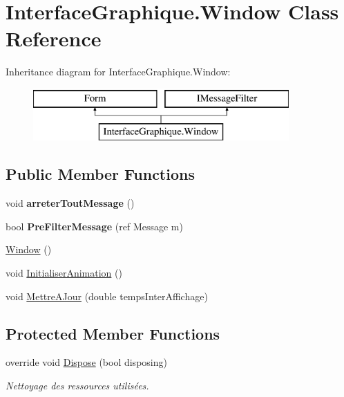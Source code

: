 \hypertarget{class_interface_graphique_1_1_window}{}\section{Interface\+Graphique.\+Window Class Reference}
\label{class_interface_graphique_1_1_window}
Inheritance diagram for Interface\+Graphique.\+Window\+:\begin{figure}[H]
\begin{center}
\leavevmode
\includegraphics[height=2.000000cm]{class_interface_graphique_1_1_window}
\end{center}
\end{figure}
\subsection*{Public Member Functions}
\begin{DoxyCompactItemize}
\item 
void {\bfseries arreter\+Tout\+Message} ()
\item 
bool {\bfseries Pre\+Filter\+Message} (ref Message m)
\item 
\hyperlink{group__inf2990_ga7e30ec49435f3c0fba10654f5d4c80f0}{Window} ()
\item 
void \hyperlink{group__inf2990_ga3a7a6e48395a43de034017fd06ab0b15}{Initialiser\+Animation} ()
\item 
void \hyperlink{group__inf2990_ga59ab317065d928c64d22120800595079}{Mettre\+A\+Jour} (double temps\+Inter\+Affichage)
\end{DoxyCompactItemize}
\subsection*{Protected Member Functions}
\begin{DoxyCompactItemize}
\item 
override void \hyperlink{class_interface_graphique_1_1_window_aebd9107b7e73f8a1b90129bc51bfabd9}{Dispose} (bool disposing)
\begin{DoxyCompactList}\small\item\em Nettoyage des ressources utilisées. \end{DoxyCompactList}\end{DoxyCompactItemize}


